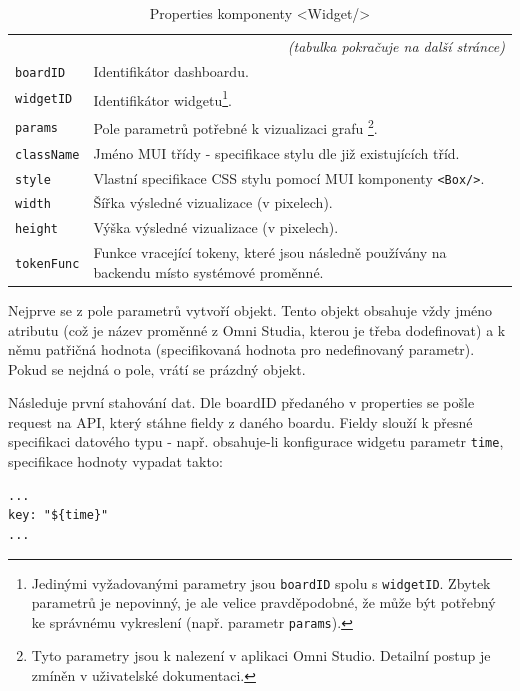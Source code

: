 \documentclass[czech, bc, kiv, he, iso690numb]{fasthesis}
\begin{document}
\begin{center}
	\begin{longtable}{p{}p{}}
	\caption{Properties komponenty <Widget/>}
	\label{tab:widgetProps}\\
	\toprule[1.5pt]
	\endhead
	\midrule
	\multicolumn{2}{r}{\textit{(tabulka pokračuje na další stránce)}}\\
	\endfoot
	\bottomrule[1.5pt]
	\endlastfoot
	\verb"boardID" & Identifikátor dashboardu.  \\
	\midrule
	\verb"widgetID" & Identifikátor widgetu\footnote{Jedinými vyžadovanými parametry jsou \texttt{boardID} spolu s \texttt{widgetID}. Zbytek parametrů je nepovinný, je ale velice pravděpodobné, že může být potřebný ke správnému vykreslení (např. parametr \texttt{params}).}. \\
	\midrule
	\verb"params" & Pole parametrů potřebné k vizualizaci grafu \footnote{Tyto parametry jsou k nalezení v aplikaci Omni Studio. Detailní postup je zmíněn v uživatelské dokumentaci.}. \\
	\midrule
	\verb"className" & Jméno MUI třídy - specifikace stylu dle již existujících tříd. \\
	\midrule
	\verb"style" & Vlastní specifikace CSS stylu pomocí MUI komponenty \texttt{<Box/>}. \\
	\midrule
	\verb"width" & Šířka výsledné vizualizace (v pixelech). \\
	\midrule
	\verb"height" & Výška výsledné vizualizace (v pixelech). \\
	\midrule
	\verb"tokenFunc" & Funkce vracející tokeny, které jsou následně používány na backendu místo systémové proměnné. \\
	\end{longtable}
\end{center}

Nejprve se z pole parametrů vytvoří objekt. Tento objekt obsahuje vždy jméno atributu (což je název proměnné z Omni Studia, kterou je třeba dodefinovat) a k němu patřičná hodnota (specifikovaná
hodnota pro nedefinovaný parametr). Pokud se nejdná o pole, vrátí se prázdný objekt.

Následuje první stahování dat. Dle boardID předaného v properties se pošle request na API, který stáhne fieldy z daného boardu. Fieldy slouží k přesné specifikaci datového typu - např.
obsahuje-li konfigurace widgetu parametr \texttt{time}, specifikace hodnoty vypadat takto:
\lstset{style=plainsrc}
\begin{lstlisting}
...
key: "${time}"
...
\end{lstlisting}
\end{document}
